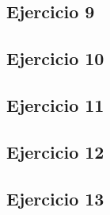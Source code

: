 \documentclass[10pt,a4paper, landscape]{article}
\begin{document}
\subsection{Ejercicio 9}
\subsection{Ejercicio 10}
\subsection{Ejercicio 11}
\subsection{Ejercicio 12}
\subsection{Ejercicio 13}
\subsection{}
\end{document}
